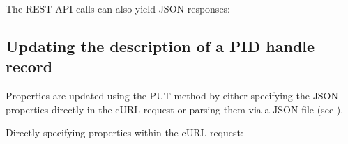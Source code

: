 \documentclass[a4paper,10pt,english]{sphinxmanual}
\begin{document}
\sphinxAtStartPar
The REST API calls can also yield JSON responses:

\sphinxAtStartPar
{}


\subsection{Updating the description of a PID handle record}
\label{\detokenize{epic-cookbook/handles:updating-the-description-of-a-pid-handle-record}}
\sphinxAtStartPar
Properties are updated using the PUT method by either specifying the
JSON properties directly in the cURL request or parsing them via a
JSON file (see ).

\sphinxAtStartPar
Directly specifying properties within the cURL request:
\end{document}
